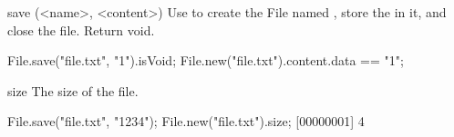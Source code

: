 \begin{urbiscriptapi}
\item[save](<name>, <content>)
  Use  to create the File named , store the
   in it, and close the file.  Return void.
\begin{urbiassert}
File.save("file.txt", "1\n").isVoid;
File.new("file.txt").content.data == "1\n";
\end{urbiassert}

\item[size]
  The size of the file.
\begin{urbiscript}
File.save("file.txt", "1234");
File.new("file.txt").size;
[00000001] 4
\end{urbiscript}
\end{urbiscriptapi}


